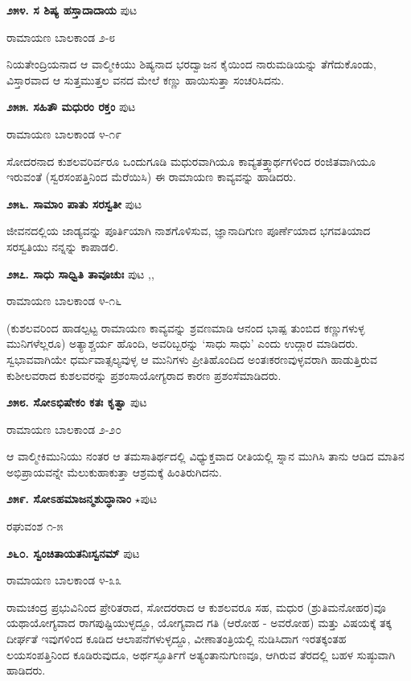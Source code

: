 \medskip
\noindent\textbf{೨೫೪. ಸ ಶಿಷ್ಯ ಹಸ್ತಾದಾದಾಯ} \hfill ಪುಟ \pageref{198}

\hfill ರಾಮಾಯಣ ಬಾಲಕಾಂಡ ೨-೮

ನಿಯತೇಂದ್ರಿಯನಾದ ಆ ವಾಲ್ಮೀಕಿಯು ಶಿಷ್ಯನಾದ ಭರದ್ವಾಜನ ಕೈಯಿಂದ ನಾರುಮಡಿಯನ್ನು ತೆಗೆದುಕೊಂಡು, ವಿಸ್ತಾರವಾದ ಆ ಸುತ್ತಮುತ್ತಲ ವನದ ಮೇಲೆ ಕಣ್ಣು ಹಾಯಿಸುತ್ತಾ ಸಂಚರಿಸಿದನು.

\medskip
\noindent\textbf{೨೫೫. ಸಹಿತೌ ಮಧುರಂ ರಕ್ತಂ} \hfill ಪುಟ \pageref{189}

\hfill ರಾಮಾಯಣ ಬಾಲಕಾಂಡ ೪-೧೯

ಸೋದರನಾದ ಕುಶಲವರಿರ್ವರೂ ಒಂದುಗೂಡಿ ಮಧುರವಾಗಿಯೂ ಕಾವ್ಯತತ್ತ್ವಾರ್ಥಗಳಿಂದ ರಂಜಿತವಾಗಿಯೂ ಇರುವಂತೆ (ಸ್ವರಸಂಪತ್ತಿನಿಂದ ಮೆರೆಯಿಸಿ) ಈ ರಾಮಾಯಣ ಕಾವ್ಯವನ್ನು ಹಾಡಿದರು.

\medskip
\noindent\textbf{೨೫೬. ಸಾಮಾಂ ಪಾತು ಸರಸ್ವತೀ} \hfill ಪುಟ \pageref{100}

\hfill ಜೀವನದಲ್ಲಿಯ ಜಾಡ್ಯವನ್ನು ಪೂರ್ತಿಯಾಗಿ ನಾಶಗೊಳಿಸುವ, ಜ್ಞಾನಾದಿಗುಣ ಪೂರ್ಣೆಯಾದ ಭಗವತಿಯಾದ ಸರಸ್ವತಿಯು ನನ್ನನ್ನು ಕಾಪಾಡಲಿ.

\medskip
\noindent\textbf{೨೫೭. ಸಾಧು ಸಾಧ್ವಿತಿ ತಾವೂಚುಃ} \hfill ಪುಟ \pageref{168},\pageref{211},\pageref{242}

\hfill ರಾಮಾಯಣ ಬಾಲಕಾಂಡ ೪-೧೬

(ಕುಶಲವರಿಂದ ಹಾಡಲ್ಪಟ್ಟ ರಾಮಾಯಣ ಕಾವ್ಯವನ್ನು ಶ್ರವಣಮಾಡಿ ಆನಂದ ಭಾಷ್ಪ ತುಂಬಿದ ಕಣ್ಣುಗಳುಳ್ಳ ಮುನಿಗಳೆಲ್ಲರೂ) ಅತ್ಯಾಶ್ಚರ್ಯ ಹೊಂದಿ, ಅವರಿಬ್ಬರನ್ನು `ಸಾಧು ಸಾಧು' ಎಂದು ಉದ್ಗಾರ ಮಾಡಿದರು. ಸ್ವಭಾವವಾಗಿಯೇ ಧರ್ಮವಾತ್ಸಲ್ಯವುಳ್ಳ ಆ ಮುನಿಗಳು ಪ್ರೀತಿಹೊಂದಿದ ಅಂತಃಕರಣವುಳ್ಳವರಾಗಿ ಹಾಡುತ್ತಿರುವ ಕುಶೀಲವರಾದ ಕುಶಲವರನ್ನು ಪ್ರಶಂಸಾಯೋಗ್ಯರಾದ ಕಾರಣ ಪ್ರಶಂಸೆಮಾಡಿದರು.

\medskip
\noindent\textbf{೨೫೮. ಸೋಽಭಿಷೇಕಂ ಕತಃ ಕೃತ್ವಾ} \hfill ಪುಟ \pageref{201}

\hfill ರಾಮಾಯಣ ಬಾಲಕಾಂಡ ೨-೨೦

ಆ ವಾಲ್ಮೀಕಿಮುನಿಯು ನಂತರ ಆ ತಮಸಾತಿರ್ಥದಲ್ಲಿ ವಿಧ್ಯುಕ್ತವಾದ ರೀತಿಯಲ್ಲಿ ಸ್ನಾನ ಮುಗಿಸಿ ತಾನು ಆಡಿದ ಮಾತಿನ ಅಭಿಪ್ರಾಯವನ್ನೇ ಮೆಲುಕುಹಾಕುತ್ತಾ ಆಶ್ರಮಕ್ಕೆ ಹಿಂತಿರುಗಿದನು.

\medskip
\noindent\textbf{೨೫೯. ಸೋಽಹಮಾಜನ್ಮಶುದ್ಧಾನಾಂ} $\star$\hfill ಪುಟ \pageref{148}

\hfill ರಘುವಂಶ ೧-೫

\medskip
\noindent\textbf{೨೬೦. ಸ್ವಂಚಿತಾಯತನಿಃಸ್ವನಮ್} \hfill ಪುಟ \pageref{250}

\hfill ರಾಮಾಯಣ ಬಾಲಕಾಂಡ ೪-೩೩

ರಾಮಚಂದ್ರ ಪ್ರಭುವಿನಿಂದ ಪ್ರೇರಿತರಾದ, ಸೋದರರಾದ ಆ ಕುಶಲವರೂ ಸಹ, ಮಧುರ (ಶ್ರುತಿಮನೋಹರ)ವೂ ಯಥಾಯೋಗ್ಯವಾದ ರಾಗಪುಷ್ಟಿಯುಳ್ಳದ್ದೂ, ಯೋಗ್ಯವಾದ ಗತಿ (ಆರೋಹ - ಅವರೋಹ) ಮತ್ತು ವಿಷಯಕ್ಕೆ ತಕ್ಕ ದೀರ್ಘತೆ ಇವುಗಳಿಂದ ಕೂಡಿದ ಆಲಾಪನೆಗಳುಳ್ಳದ್ದೂ, ವೀಣಾತಂತ್ರಿಯಲ್ಲಿ ನುಡಿಸಿದಾಗ ಇರತಕ್ಕಂತಹ ಲಯಸಂಪತ್ತಿನಿಂದ ಕೂಡಿರುವುದೂ, ಅರ್ಥಸ್ಫೂರ್ತಿಗೆ ಅತ್ಯಂತಾನುಗುಣವೂ, ಆಗಿರುವ ತೆರದಲ್ಲಿ ಬಹಳ ಸುಷ್ಠುವಾಗಿ ಹಾಡಿದರು.


